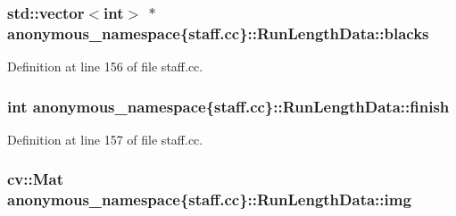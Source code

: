 \subsubsection[{\texorpdfstring{blacks}{blacks}}]{\setlength{\rightskip}{0pt plus 5cm}std\+::vector$<$int$>$ $\ast$ anonymous\+\_\+namespace\{staff.\+cc\}\+::Run\+Length\+Data\+::blacks}\hypertarget{structanonymous__namespace_02staff_8cc_03_1_1RunLengthData_acac0ba1ce364389ce57220db37036035}{}\label{structanonymous__namespace_02staff_8cc_03_1_1RunLengthData_acac0ba1ce364389ce57220db37036035}


Definition at line 156 of file staff.\+cc.

\subsubsection[{\texorpdfstring{finish}{finish}}]{\setlength{\rightskip}{0pt plus 5cm}int anonymous\+\_\+namespace\{staff.\+cc\}\+::Run\+Length\+Data\+::finish}\hypertarget{structanonymous__namespace_02staff_8cc_03_1_1RunLengthData_a4eb4c72887a7a75f3b99c711a7af9638}{}\label{structanonymous__namespace_02staff_8cc_03_1_1RunLengthData_a4eb4c72887a7a75f3b99c711a7af9638}


Definition at line 157 of file staff.\+cc.

\subsubsection[{\texorpdfstring{img}{img}}]{\setlength{\rightskip}{0pt plus 5cm}cv\+::\+Mat anonymous\+\_\+namespace\{staff.\+cc\}\+::Run\+Length\+Data\+::img}\hypertarget{structanonymous__namespace_02staff_8cc_03_1_1RunLengthData_a5e1faf2a25c952ac51297388a44af198}{}\label{structanonymous__namespace_02staff_8cc_03_1_1RunLengthData_a5e1faf2a25c952ac51297388a44af198}


